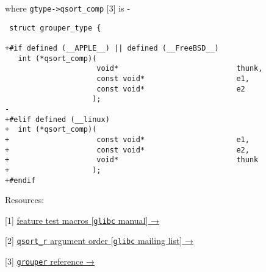 where \lstinline!gtype->qsort_comp! {[}3{]} is -

\begin{lstlisting}
 struct grouper_type {

+#if defined (__APPLE__) || defined (__FreeBSD__)
   int (*qsort_comp)(
                     void*                           thunk,
                     const void*                     e1,
                     const void*                     e2
                    );
-
+#elif defined (__linux)
+  int (*qsort_comp)(
+                    const void*                     e1,
+                    const void*                     e2,
+                    void*                           thunk
+                   );
+#endif
\end{lstlisting}

Resources:

{[}1{]}
\href{http://www.gnu.org/software/libc/manual/html\_node/Feature-Test-Macros.html}{feature
test macros {[}\lstinline!glibc! manual{]} →}

{[}2{]}
\href{http://sourceware.org/ml/libc-alpha/2008-12/msg00003.html}{\lstinline!qsort_r!
argument order {[}\lstinline!glibc! mailing list{]} →}

{[}3{]}
\href{http://dl.dropbox.com/u/500389/mthesis/docs-engine/html/grouper\_8c.html}{\lstinline!grouper!
reference →}
